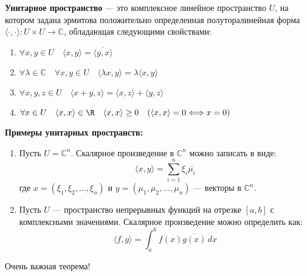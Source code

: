 \documentclass[12px]{report}
\begin{document}
\vspace{1cm}

\begin{shdef}
    \begin{definition}
        \leavevmode \newline
        
        \textbf{Унитарное пространство} — это комплексное линейное пространство $U$, на котором задана эрмитова положительно определенная полуторалинейная форма $\langle \cdot, \cdot \rangle: U \times U \to \mathbb{C}$, обладающая следующими свойствами:
    \begin{enumerate}
        \item $\forall x, y \in U \quad \langle x, y \rangle = \overline{\langle y, x \rangle}$
        \item $\forall \lambda \in \mathbb{C} \quad \forall x, y \in U \quad \langle \lambda x, y \rangle = \lambda \langle x, y \rangle$
        \item $\forall x, y, z \in U \quad \langle x + y, z \rangle = \langle x, z \rangle + \langle y, z \rangle$
        \item $\forall x \in U \quad \langle x,x \rangle \in \R \quad \langle x, x \rangle \geq 0 \quad (\langle x, x \rangle = 0 \Longleftrightarrow x = 0)$
    \end{enumerate}
    \vspace{0.3cm}
    \end{definition}
\end{shdef}

\textbf{Примеры унитарных пространств:}
\begin{shex}
    \begin{enumerate}
        \item Пусть \( U = \mathbb{C}^n \).
    Скалярное произведение в \(\mathbb{C}^n\) можно записать в виде:
    \[
    \langle x, y \rangle = \sum_{i=1}^n \xi_i \overline{\mu_i}
    \]
    где \( x = (\xi_1, \xi_2, \ldots, \xi_n) \) и \( y = (\mu_1, \mu_2, \ldots, \mu_n) \) — векторы в \(\mathbb{C}^n\).

\vspace{0.2cm}
        \item Пусть \( U \) — пространство непрерывных функций на отрезке \([a, b]\) с комплексными значениями.
    Скалярное произведение можно определить как:
    \[
    \langle f, g \rangle = \int_a^b f(x) \overline{g(x)} \, dx
    \]
    \end{enumerate}
\end{shex}

\begin{shth}
\begin{theorem}
    Очень важная теорема!
\end{theorem}
\end{shth}



\clearpage
\end{document}
